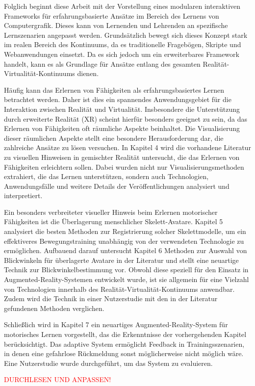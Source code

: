 Folglich beginnt diese Arbeit mit der Vorstellung eines modularen interaktiven Frameworks für erfahrungsbasierte Ansätze im Bereich des Lernens von Computergrafik. Dieses kann von Lernenden und Lehrenden an spezifische Lernszenarien angepasst werden. Grundsätzlich bewegt sich dieses Konzept stark im realen Bereich des Kontinuums, da es traditionelle Fragebögen, Skripte und Webanwendungen einsetzt. Da es sich jedoch um ein erweiterbares Framework handelt, kann es als Grundlage für Ansätze entlang des gesamten Realität-Virtualität-Kontinuums dienen.

Häufig kann das Erlernen von Fähigkeiten als erfahrungsbasiertes Lernen betrachtet werden. Daher ist dies ein spannendes Anwendungsgebiet für die Interaktion zwischen Realität und Virtualität. Insbesondere die Unterstützung durch erweiterte Realität (XR) scheint hierfür besonders geeignet zu sein, da das Erlernen von Fähigkeiten oft räumliche Aspekte beinhaltet. Die Visualisierung dieser räumlichen Aspekte stellt eine besondere Herausforderung dar, die zahlreiche Ansätze zu lösen versuchen. In Kapitel 4 wird die vorhandene Literatur zu visuellen Hinweisen in gemischter Realität untersucht, die das Erlernen von Fähigkeiten erleichtern sollen. Dabei wurden nicht nur Visualisierungsmethoden extrahiert, die das Lernen unterstützen, sondern auch Technologien, Anwendungsfälle und weitere Details der Veröffentlichungen analysiert und interpretiert.

Ein besonders verbreiteter visueller Hinweis beim Erlernen motorischer Fähigkeiten ist die Überlagerung menschlicher Skelett-Avatare. Kapitel 5 analysiert die besten Methoden zur Registrierung solcher Skelettmodelle, um ein effektiveres Bewegungstraining unabhängig von der verwendeten Technologie zu ermöglichen. Aufbauend darauf untersucht Kapitel 6 Methoden zur Auswahl von Blickwinkeln für überlagerte Avatare in der Literatur und stellt eine neuartige Technik zur Blickwinkelbestimmung vor. Obwohl diese speziell für den Einsatz in Augmented-Reality-Systemen entwickelt wurde, ist sie allgemein für eine Vielzahl von Technologien innerhalb des Realität-Virtualität-Kontinuums anwendbar. Zudem wird die Technik in einer Nutzerstudie mit den in der Literatur gefundenen Methoden verglichen.

Schließlich wird in Kapitel 7 ein neuartiges Augmented-Reality-System für motorisches Lernen vorgestellt, das die Erkenntnisse der vorhergehenden Kapitel berücksichtigt. Das adaptive System ermöglicht Feedback in Trainingsszenarien, in denen eine gefahrlose Rückmeldung sonst möglicherweise nicht möglich wäre. Eine Nutzerstudie wurde durchgeführt, um das System zu evaluieren.

\textcolor{red}{DURCHLESEN UND ANPASSEN!}